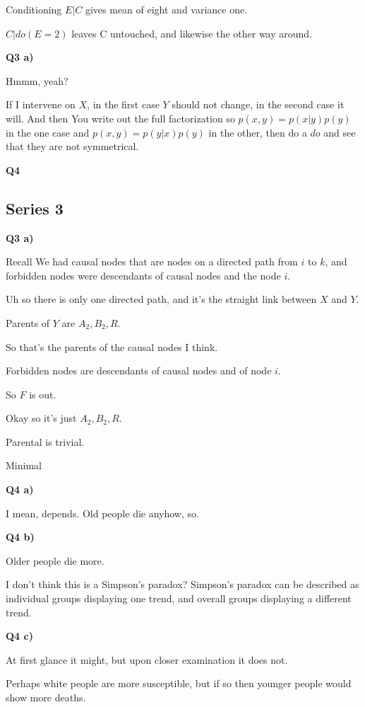 \documentclass{article}
\begin{document}
			Conditioning $E|C$ gives mean of eight and variance one.
			
			$C|do(E=2)$ leaves C untouched, and likewise the other way around.
			
			
		\textbf{Q3 a)}
		
			Hmmm, yeah?
			
			If I intervene on $X$, in the first case $Y$ should not change, in the second case it will. And then You write out the full factorization so $p(x, y) = p(x|y)p(y)$ in the one case and $p(x, y) = p(y|x)p(y)$ in the other, then do a $do$ and see that they are not symmetrical.
			
		\textbf{Q4}
		
	\subsection{Series 3}
	
		\textbf{Q3 a)}
		
			Recall We had causal nodes that are nodes on a directed path from $i$ to $k$, and forbidden nodes were descendants of causal nodes and the node $i$.
			
			Uh so there is only one directed path, and it's the straight link between $X$ and $Y$.
			
			Parents of $Y$ are $A_2, B_2, R$.
			
			So that's the parents of the causal nodes I think.
			
			Forbidden nodes are descendants of causal nodes and of node $i$.
			
			So $F$ is out.
			
			Okay so it's just $A_2, B_2, R$.
			
			Parental is trivial.
			
			Minimal
			
		\textbf{Q4 a)}
	
			I mean, depends. Old people die anyhow, so.
			
		\textbf{Q4 b)}
		
			Older people die more. 
			
			I don't think this is a Simpson's paradox? Simpson's paradox can be described as individual groups displaying one trend, and overall groups displaying a different trend. 
			
		\textbf{Q4 c)}

			At first glance it might, but upon closer examination it does not.
			
			Perhaps white people are more susceptible, but if so then younger people would show more deaths.
			
\end{document}
